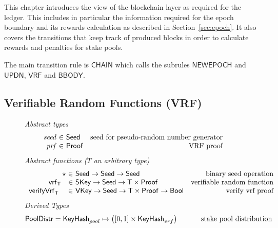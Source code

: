 This chapter introduces the view of the blockchain layer as required for the
ledger. This includes in particular the information required for the epoch
boundary and its rewards calculation as described in Section~\ref{sec:epoch}. It
also covers the transitions that keep track of produced blocks in order to
calculate rewards and penalties for stake pools.

The main transition rule is $\mathsf{CHAIN}$ which calls the subrules
$\mathsf{NEWEPOCH}$ and $\mathsf{UPDN}$, $\mathsf{VRF}$ and $\mathsf{BBODY}$.

\subsection{Verifiable Random Functions (VRF)}
\label{sec:defs-vrf}

\begin{figure}[htb]
  \emph{Abstract types}
  \begin{equation*}
    \begin{array}{r@{~\in~}lr}
      \var{seed} & \Seed  & \text{seed for pseudo-random number generator}\\
      \var{prf} & \Proof  & \text{VRF proof}\\
    \end{array}
  \end{equation*}
  \emph{Abstract functions ($T$ an arbitrary type)}
  \begin{equation*}
    \begin{array}{r@{~\in~}lr}
      \seedOp & \Seed \to \Seed \to \Seed & \text{binary seed operation} \\
      \vrf{\T}{}{} & \SKey \to \Seed \to \T\times\Proof
                   & \text{verifiable random function} \\
      \verifyVrf{\T}{}{}{} & \VKey \to \Seed \to \T\times\Proof \to \Bool
                           & \text{verify vrf proof} \\
    \end{array}
  \end{equation*}
  \emph{Derived Types}
  \begin{align*}
    \mathsf{PoolDistr} = \mathsf{KeyHash}_{pool} \mapsto \left([0, 1]\times\mathsf{KeyHash}_{vrf}\right)
      \text{ \hspace{1cm}stake pool distribution}
  \end{align*}


\end{figure}

